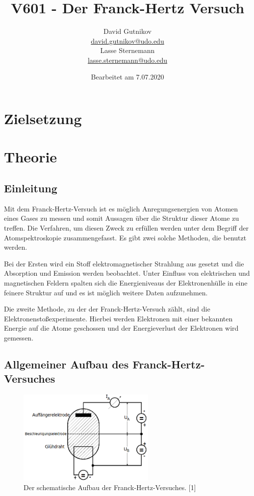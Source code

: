 \documentclass[titlepage = firstcover]{scrartcl}
\title{V601 - Der Franck-Hertz Versuch}
\author{
  David Gutnikov\\
  \href{mailto:david.gutnikov@udo.edu}{david.gutnikov@udo.edu}\\
  Lasse Sternemann\\
  \href{mailto:lasse.sternemann@udo.edu}{lasse.sternemann@udo.edu}
}
\date{Bearbeitet am 7.07.2020}
\begin{document}
    \maketitle
    \newpage
    \tableofcontents
    \newpage

    \section{Zielsetzung}


    \section{Theorie}
        \subsection{Einleitung}
            Mit dem Franck-Hertz-Versuch ist es möglich Anregungsenergien von Atomen eines Gases zu messen und somit Aussagen über die Struktur dieser Atome zu treffen.
            Die Verfahren, um diesen Zweck zu erfüllen werden unter dem Begriff der Atomspektroskopie zusammengefasst.
            Es gibt zwei solche Methoden, die benutzt werden.

            Bei der Ersten wird ein Stoff elektromagnetischer Strahlung aus gesetzt und die Absorption und Emission werden beobachtet. Unter Einfluss von elektrischen und magnetischen Feldern spalten sich die Energieniveaus der Elektronenhülle in eine feinere Struktur auf und es ist möglich weitere Daten aufzunehmen.

            Die zweite Methode, zu der der Franck-Hertz-Versuch zählt, sind die Elektronenstoßexperimente. Hierbei werden Elektronen mit einer bekannten Energie auf die Atome geschossen und der Energieverlust der Elektronen wird gemessen.

        \subsection{Allgemeiner Aufbau des Franck-Hertz-Versuches}
            \begin{figure}[h]
                \centering
                \includegraphics[width = 0.6\textwidth]{Bilder/Aufbau_FranckHertz.png}
                \caption{Der schematische Aufbau der Franck-Hertz-Versuches. [1]}
                \label{fig:Aufbau_FranckHertz}
            \end{figure}
\end{document}
